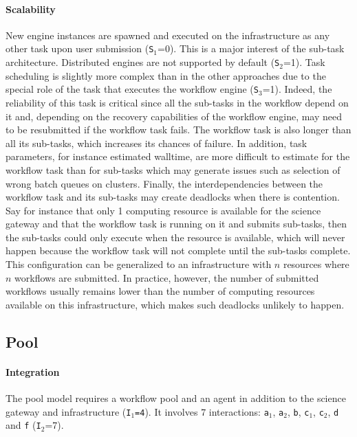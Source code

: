 \documentclass[preprint,3p,twocolumn]{elsarticle}
\begin{document}
\paragraph{Scalability}
New engine instances are spawned and executed on the infrastructure as
any other task upon user submission (\texttt{S$_1$}=0). This is a
major interest of the sub-task architecture. Distributed engines are
not supported by default (\texttt{S$_2$}=1). Task scheduling is
slightly more complex than in the other approaches due to the special
role of the task that executes the workflow engine
(\texttt{S$_3$}=1). Indeed, the reliability of this task is critical
since all the sub-tasks in the workflow depend on it and, depending on
the recovery capabilities of the workflow engine, may need to be
resubmitted if the workflow task fails. The workflow task is also
longer than all its sub-tasks, which increases its chances of
failure. In addition, task parameters, for instance estimated
walltime, are more difficult to estimate for the workflow task than
for sub-tasks which may generate issues such as selection of wrong
batch queues on clusters. Finally, the interdependencies between the
workflow task and its sub-tasks may create deadlocks when there is
contention. Say for instance that only 1 computing resource is
available for the science gateway and that the workflow task is
running on it and submits sub-tasks, then the sub-tasks could only
execute when the resource is available, which will never happen
because the workflow task will not complete until the sub-tasks
complete. This configuration can be generalized to an infrastructure
with $n$ resources where $n$ workflows are submitted. In practice,
however, the number of submitted workflows usually remains lower than
the number of computing resources available on this infrastructure,
which makes such deadlocks unlikely to happen.

\subsection{Pool}

\paragraph{Integration} The pool model requires a workflow pool and an
agent in addition to the science gateway and infrastructure
(\texttt{I$_1$=4}). It involves 7 interactions: \texttt{a$_1$},
\texttt{a$_2$}, \texttt{b}, \texttt{c$_1$}, \texttt{c$_2$}, \texttt{d}
and \texttt{f} (\texttt{I$_2$}=7).
\end{document}

